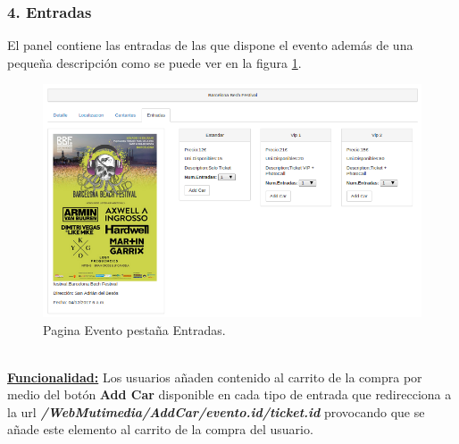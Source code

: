 \subsubsection*{4. Entradas}
El panel contiene las entradas de las que dispone el evento  además de una pequeña descripción como se puede ver en la figura \ref{fig:Entradas_Evento}.
\begin{figure}[!h]
\begin{center}
   \includegraphics[width=0.5\linewidth]{Figures/Entradas_Evento}
  \decoRule
  \caption[Evento pestaña Entradas]{Pagina Evento pestaña Entradas.}
\label{fig:Entradas_Evento}
\end{center}
\end{figure}
\\\underline{\textbf{Funcionalidad:}} Los usuarios añaden contenido al carrito de la compra por medio del botón \textbf{Add Car} disponible en cada tipo de entrada que redirecciona a la url \textbf{\textit{/WebMutimedia/AddCar/{{evento.id}}/{{ticket.id}}}} provocando que se añade este elemento al carrito de la compra del usuario.
